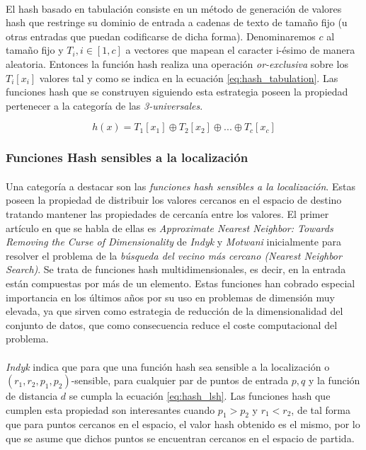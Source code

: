 \documentclass{subfiles}
\begin{document}
          \paragraph{}
          El hash basado en tabulación consiste en un método de generación de valores hash que restringe su dominio de entrada a cadenas de texto de tamaño fijo (u otras entradas que puedan codificarse de dicha forma). Denominaremos $c$ al tamaño fijo y  $T_i, i \in [1,c]$ a vectores que mapean el caracter i-ésimo de manera aleatoria. Entonces la función hash realiza una operación \emph{or-exclusiva} sobre los $T_i[x_i]$ valores tal y como se indica en la ecuación \eqref{eq:hash_tabulation}. Las funciones hash que se construyen siguiendo esta estrategia poseen la propiedad pertenecer a la categoría de las \emph{3-universales}.

          \begin{equation}
          \label{eq:hash_tabulation}
            h(x) = T_1[x_1] \oplus T_2[x_2] \oplus ... \oplus T_c[x_c]
          \end{equation}

      \subsubsection{Funciones Hash sensibles a la localización}
      \label{sec:hash_lsh}

        \paragraph{}
        Una categoría a destacar son las \emph{funciones hash sensibles a la localización}. Estas poseen la propiedad de distribuir los valores cercanos en el espacio de destino tratando mantener las propiedades de cercanía entre los valores. El primer artículo en que se habla de ellas es \emph{Approximate Nearest Neighbor: Towards Removing the Curse of Dimensionality} \cite{indyk1998approximate} de \emph{Indyk} y \emph{Motwani} inicialmente para resolver el problema de la \emph{búsqueda del vecino más cercano (Nearest Neighbor Search)}. Se trata de funciones hash multidimensionales, es decir, en la entrada están compuestas por más de un elemento. Estas funciones han cobrado especial importancia en los últimos años por su uso en problemas de dimensión muy elevada, ya que sirven como estrategia de reducción de la dimensionalidad del conjunto de datos, que como consecuencia reduce el coste computacional del problema.

        \paragraph{}
        \emph{Indyk} indica que para que una función hash sea sensible a la localización o $(r_1,r_2, p_1, p_2)$-sensible, para cualquier par de puntos de entrada $p,q$ y la función de distancia $d$ se cumpla la ecuación \eqref{eq:hash_lsh}. Las funciones hash que cumplen esta propiedad son interesantes cuando $p_1 > p_2$ y $r_1 < r_2$, de tal forma que para puntos cercanos en el espacio, el valor hash obtenido es el mismo, por lo que se asume que dichos puntos se encuentran cercanos en el espacio de partida.
\end{document}
